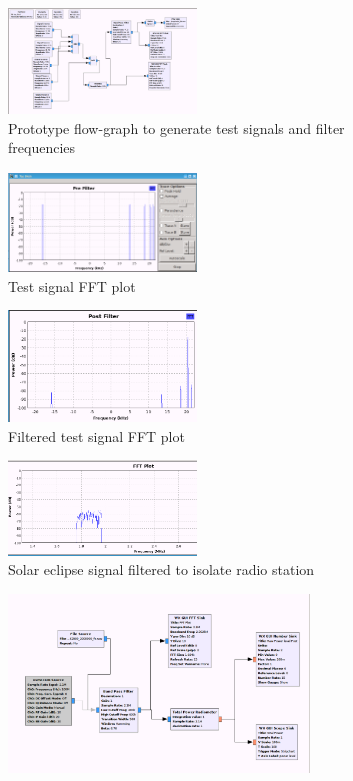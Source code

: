 %
\begin{figure}	
	\centering
	\begin{subfigure}[t]{5cm}
		\centering
		\includegraphics[width=5cm]{images/21}
		\caption{Prototype flow-graph to generate test signals and filter frequencies}
		\label{fig:gnuradio_companion_flowgraph_01} 
	\end{subfigure}
	\quad
	\begin{subfigure}[t]{5cm}
		\centering
		\includegraphics[width=5cm]{images/22}
		\caption{Test signal FFT plot}
		\label{fig:gnuradio_companion_flowgraph_02} 
	\end{subfigure}
	\quad
	\begin{subfigure}[t]{5cm}
		\centering
		\includegraphics[width=5cm]{images/23}
		\caption{Filtered test signal FFT plot}
		\label{fig:gnuradio_companion_flowgraph_03} 
	\end{subfigure}
	\quad
	\begin{subfigure}[t]{5cm}
		\centering
		\includegraphics[width=5cm]{images/76}
		\caption{Solar eclipse signal filtered to isolate radio station}
		\label{fig:gnuradio_companion_flowgraph_04} 
	\end{subfigure}
	\quad
	\begin{subfigure}[t]{8cm}
		\centering
		\includegraphics[width=8cm]{images/85}

\end{subfigure}
\end{figure}
